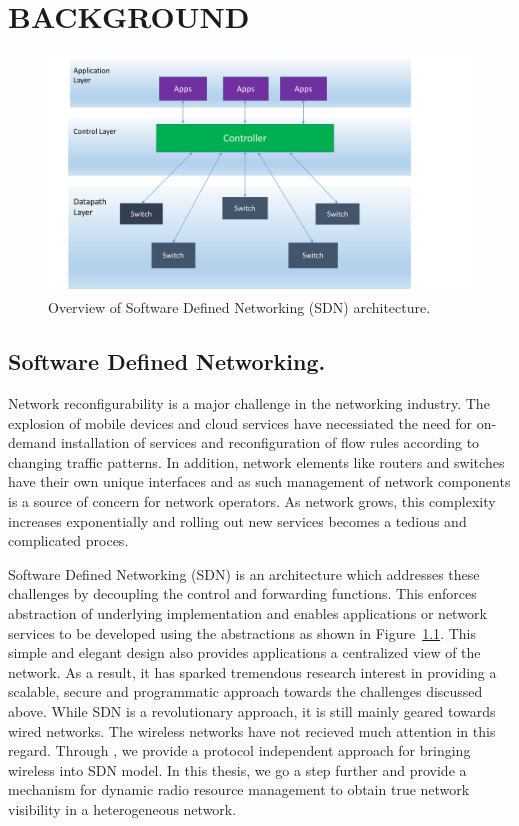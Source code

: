 \chapter{\uppercase {Background}}
\label{sec:background}
\begin{figure}[t]
  \centering
  \includegraphics[width=1\textwidth]{figures/SDN.pdf}
  \caption{Overview of Software Defined Networking (SDN) architecture.}
  \label{fig:SDN}
\end{figure}

\section{Software Defined Networking.}
Network reconfigurability is a major challenge in the networking industry. The explosion of mobile devices and cloud services have necessiated the need for on-demand installation of services and reconfiguration of flow rules according to changing traffic patterns. In addition, network elements like routers and switches have their own unique interfaces and as such management of network components is a source of concern for network operators. As network grows, this complexity increases exponentially and rolling out new services becomes a tedious and complicated proces.

Software Defined Networking (SDN) is an architecture which addresses these challenges by decoupling the control and forwarding functions. This enforces abstraction of underlying implementation and enables applications or network services to be developed using the abstractions as shown in Figure~\ref{fig:SDN}. This simple and elegant design also provides applications a centralized view of the network. As a result, it has sparked tremendous research interest in providing a scalable, secure and programmatic approach towards the challenges discussed above. While SDN is a revolutionary approach, it is still mainly geared towards wired networks. The wireless networks have not recieved much attention in this regard. Through \aetherflow, we provide a protocol independent approach for bringing wireless into SDN model. In this thesis, we go a step further and provide a mechanism for dynamic radio resource management to obtain true network visibility in a heterogeneous network.     

